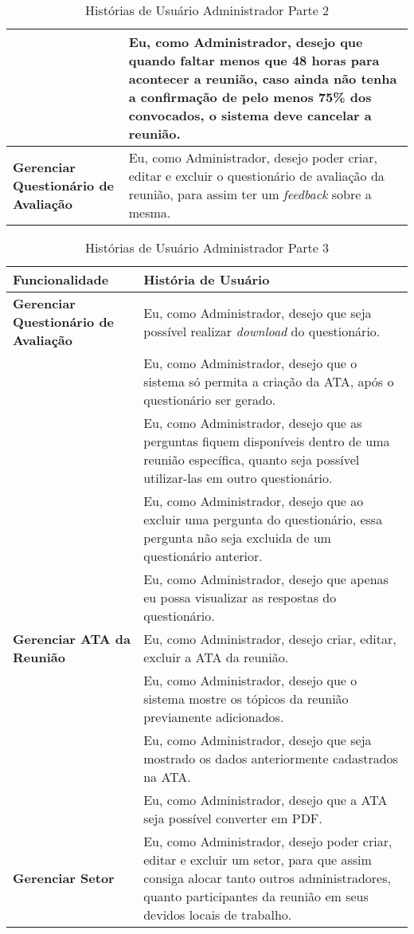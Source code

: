 \begin{table}[H]
\begin{tabular}{|p{5.0cm}|p{10.0cm}|}
	& Eu, como Administrador, desejo que quando faltar menos que 48 horas para acontecer a reunião, caso ainda não tenha a confirmação de pelo menos 75\% dos convocados, o sistema deve cancelar a reunião. \\ \hline
	\textbf{Gerenciar Questionário de Avaliação} & Eu, como Administrador, desejo poder criar, editar e excluir o questionário de avaliação da reunião, para assim ter um \textit{feedback} sobre a mesma. \\ \hline 
	\end{tabular}
	 \caption{Histórias de Usuário Administrador Parte 2}
	 \label{tab:historias_de_usuario_administrador_parte2}
\end{table}

\begin{table}[H]
	\begin{tabular}{|p{5.0cm}|p{10.0cm}|} 
	\hline
	\textbf{Funcionalidade} & \textbf{História de Usuário} \\ \hline
	\textbf{Gerenciar Questionário de Avaliação} & Eu, como Administrador, desejo que seja possível realizar \textit{download} do questionário. \\ \hline
	& Eu, como Administrador, desejo que o sistema só permita a criação da ATA, após o questionário ser gerado. \\ \hline
	& Eu, como Administrador, desejo que as perguntas fiquem disponíveis dentro de uma reunião específica, quanto seja possível utilizar-las em outro questionário. \\ \hline
	& Eu, como Administrador, desejo que ao excluir uma pergunta do questionário, essa pergunta não seja excluida de um questionário anterior. \\ \hline
	& Eu, como Administrador, desejo que apenas eu possa visualizar as respostas do questionário. \\ \hline
	\textbf{Gerenciar ATA da Reunião} & Eu, como Administrador, desejo criar, editar, excluir a ATA da reunião. \\ \hline
	& Eu, como Administrador, desejo que o sistema mostre os tópicos da reunião previamente adicionados. \\ \hline
	& Eu, como Administrador, desejo que seja mostrado os dados anteriormente cadastrados na ATA. \\ \hline
	& Eu, como Administrador, desejo que a ATA seja possível converter em PDF. \\ \hline
	\textbf{Gerenciar Setor} & Eu, como Administrador, desejo poder criar, editar e excluir um setor, para que assim consiga alocar tanto outros administradores, quanto participantes da reunião em seus devidos locais de trabalho. \\ \hline
	\end{tabular}
	 \caption{Histórias de Usuário Administrador Parte 3}
	 \label{tab:historias_de_usuario_administrador_parte3}
\end{table}

